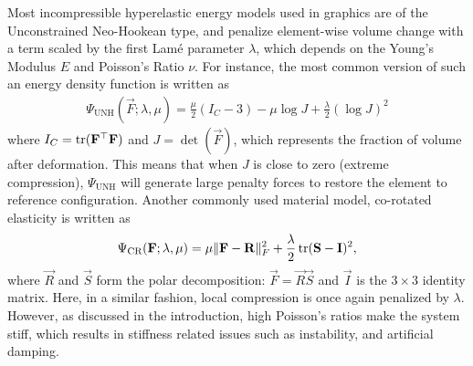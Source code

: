 Most incompressible hyperelastic energy models used in graphics are of
the Unconstrained Neo-Hookean type, and penalize element-wise volume change with a term scaled by
the first Lam\'e parameter $\lambda$, which depends on the Young's Modulus $E$ and Poisson's Ratio
$\nu$. For instance, the most common version of such an energy density function
\cite{BonetWood:2008} is written as
\begin{align}
\Psi_{\text{UNH}}(\vec{F}; \lambda, \mu) = \frac{\mu}{2}(I_C - 3) - \mu \log J + \frac{\lambda}{2} (\log J)^2
\label{eq:neohookean}
\end{align}
where $I_C = \operatorname*{tr}(\mathbf{F}^{\top}\mathbf{F})$ and $J = \det(\vec{F})$, which represents the fraction of
volume after deformation. This means that when $J$ is close to zero (extreme compression),
$\Psi_{\text{UNH}}$ will generate large penalty forces to restore the element to reference
configuration. Another commonly used material model, co-rotated elasticity \cite{McAdams:2011} is written as
\begin{align*}
\Psi_{\text{CR}}(\mathbf{F}; \lambda, \mu) = \mu\|\mathbf{F} - \mathbf{R}\|^2_F + \frac{\lambda}{2} \operatorname*{tr}(\mathbf{S} - \mathbf{I})^2,
\end{align*}
where $\vec{R}$ and $\vec{S}$ form the polar decomposition: $\vec{F} = \vec{R}\vec{S}$ and $\vec{I}$
is the $3\times3$ identity matrix. Here, in a similar fashion, local compression is once again
penalized by $\lambda$. However, as discussed in the introduction, high Poisson's ratios make the
system stiff, which results in stiffness related issues such as instability, and artificial damping.




